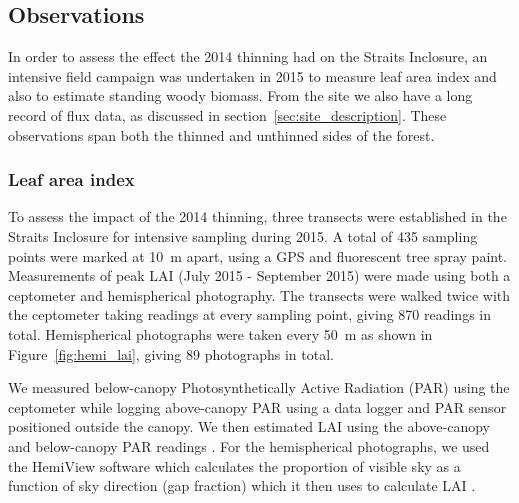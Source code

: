 \documentclass[draft,linenumbers]{agujournal}
\begin{document}
\subsection{Observations} \label{sec:obs}

In order to assess the effect the 2014 thinning had on the Straits Inclosure, an intensive field campaign was undertaken in 2015 to measure leaf area index and also to estimate standing woody biomass. From the site we also have a long record of flux data, as discussed in section~\ref{sec:site_description}. These observations span both the thinned and unthinned sides of the forest.

\subsubsection{Leaf area index}

To assess the impact of the 2014 thinning, three transects were established in the Straits Inclosure for intensive sampling during 2015. A total of 435 sampling points were marked at 10~m apart, using a GPS and fluorescent tree spray paint. Measurements of peak LAI (July 2015 - September 2015) were made using both a ceptometer and hemispherical photography. The transects were walked twice with the ceptometer taking readings at every sampling point, giving 870 readings in total. Hemispherical photographs were taken every 50~m as shown in Figure~\ref{fig:hemi_lai}, giving 89 photographs in total. 

We measured below-canopy Photosynthetically Active Radiation (PAR) using the ceptometer while logging above-canopy PAR using a data logger and PAR sensor positioned outside the canopy. We then estimated LAI using the above-canopy and below-canopy PAR readings \citep{fassnacht1994comparison}. For the hemispherical photographs, we used the HemiView software \citep{rich1999hemiview} which calculates the proportion of visible sky as a function of sky direction (gap fraction) which it then uses to calculate LAI \citep{Jonckheere2004}.
\end{document}
